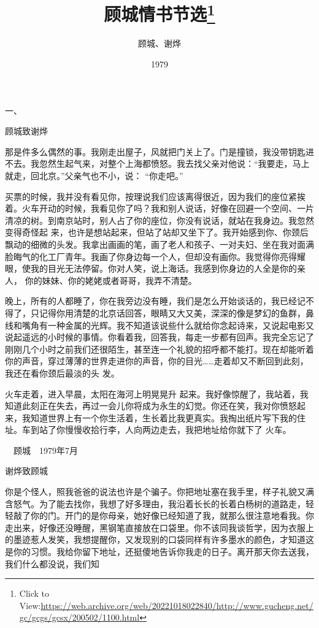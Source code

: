 \documentclass{article}
\title{顾城情书节选\footnote{Click to View:\url{https://web.archive.org/web/20221018022840/http://www.gucheng.net/gc/gcgs/gcsx/200502/1100.html}}}
\author{顾城、谢烨}
\date{1979}
\begin{document}

\maketitle


\Large


﻿一、 


顾城致谢烨 

那是件多么偶然的事。我刚走出屋子，风就把门关上了。门是撞锁，我没带钥匙进不去。我忽然生起气来，对整个上海都愤怒。我去找父亲对他说：“我要走，马上就走，回北京。”父亲气也不小，说：
“你走吧。” 

买票的时候，我并没有看见你，按理说我们应该离得很近，因为我们的座位紧挨着。火车开动的时候，我看见你了吗？我和别人说话，好像在回避一个空间、一片清凉的树。到南京站时，别人占了你的座位，你没有说话，就站在我身边。我忽然变得奇怪起
\newpage
来，也许是想站起来，但站了站却又坐下了。我开始感到你、你颈后飘动的细微的头发。我拿出画画的笔，画了老人和孩子、一对夫妇、坐在我对面满脸晦气的化工厂青年。我画了你身边每一个人，但却没有画你。我觉得你亮得耀眼，使我的目光无法停留。你对人笑，说上海话。我感到你身边的人全是你的亲人，
你的妹妹、你的姥姥或者哥哥，我弄不清楚。 

晚上，所有的人都睡了，你在我旁边没有睡，我们是怎么开始谈话的，我已经记不得了，只记得你用清楚的北京话回答，眼睛又大又美，深深的像是梦幻的鱼群，鼻线和嘴角有一种金属的光辉。我不知道该说些什么就给你念起诗来，又说起电影又说起遥远的小时候的事情。你看着我，回答我，每走一步都有回声。我完全忘记了刚刚几个小时之前我们还很陌生，甚至连一个礼貌的招呼都不能打。现在却能听着你的声音，穿过薄薄的世界走进你的声音，你的目光……走着却又不断回到此刻，我还在看你颈后最淡的头
发。 

火车走着，进入早晨，太阳在海河上明晃晃升
\newpage
起来。我好像惊醒了，我站着，我知道此刻正在失去，再过一会儿你将成为永生的幻觉。你还在笑，我对你愤怒起来，我知道世界上有一个你生活着，生长着比我更真实。我掏出纸片写下我的住址。车到站了你慢慢收拾行李，人向两边走去，我把地址给你就下了
火车。 


　顾城　1979年7月 


谢烨致顾城 

你是个怪人，照我爸爸的说法也许是个骗子。你把地址塞在我手里，样子礼貌又满含怒气。为了能去找你，我想了好多理由，我沿着长长的长着白杨树的道路走，轻轻敲了你的门。开门的是你母亲，她好像已经知道了我，就那么很注意地看我。你走出来，好像还没睡醒，黑钢笔直接放在口袋里。你不该同我谈哲学，因为衣服上的墨迹惹人发笑，我想提醒你，又发现别的口袋同样有许多墨水的颜色，才知道这是你的习惯。我给你留下地址，还挺傻地告诉你我走的日子。离开那天你去送我，我们什么都没说，我们知
\newpage
\end{document}
